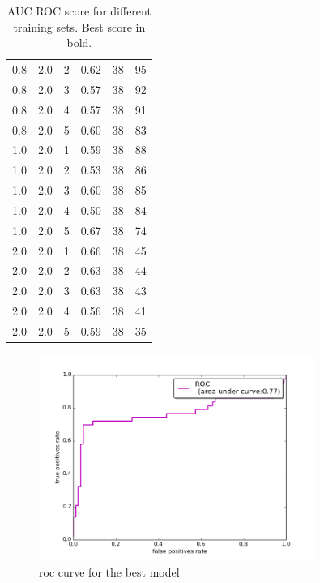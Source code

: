 \documentclass{article}
\begin{document}
\begin{table}[!h]
\begin{tabular}{c  c  c | c  c c}
		0.8 & 2.0 & 2 & 0.62 & 38 & 95\\
		0.8 & 2.0 & 3 & 0.57 & 38 & 92\\
		0.8 & 2.0 & 4 & 0.57 & 38 & 91\\
		0.8 & 2.0 & 5 & 0.60 & 38 & 83\\
		1.0 & 2.0 & 1 & 0.59 & 38 & 88\\
		1.0 & 2.0 & 2 & 0.53 & 38 & 86\\
		1.0 & 2.0 & 3 & 0.60 & 38 & 85\\
		1.0 & 2.0 & 4 & 0.50 & 38 & 84\\
		1.0 & 2.0 & 5 & 0.67 & 38 & 74\\
		2.0 & 2.0 & 1 & 0.66 & 38 & 45\\
		2.0 & 2.0 & 2 & 0.63 & 38 & 44\\
		2.0 & 2.0 & 3 & 0.63 & 38 & 43\\
		2.0 & 2.0 & 4 & 0.56 & 38 & 41\\
		2.0 & 2.0 & 5 & 0.59 & 38 & 35\\

	\end{tabular}
	\caption{AUC ROC score for different training sets. Best score in bold.}
	\label{table:exp_res}
\end{table}


\begin{figure}[h]
	\centering
	\includegraphics[width= 0.8\textwidth]{roc.png}
	\caption{roc curve for the best model}
	\label{fig:roc_best}
\end{figure}
\end{document}

